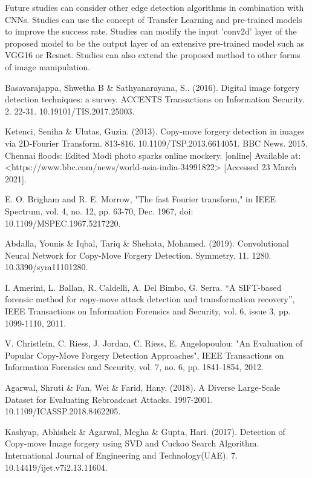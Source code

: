\documentclass[conference]{IEEEtran}
\begin{document}
Future studies can consider other edge detection algorithms in combination with CNNs. Studies can use the concept of Transfer Learning and pre-trained models to improve the success rate. Studies can modify the input 'conv2d' layer of the proposed model to be the output layer of an extensive pre-trained model such as VGG16 or Resnet. Studies can also extend the proposed method to other forms of image manipulation.


\begin{thebibliography}{00}
Basavarajappa, Shwetha B \& Sathyanarayana, S.. (2016). Digital image forgery detection techniques: a survey. ACCENTS Transactions on Information Security. 2. 22-31. 10.19101/TIS.2017.25003.

Ketenci, Seniha \& Ulutas, Guzin. (2013). Copy-move forgery detection in images via 2D-Fourier Transform. 813-816. 10.1109/TSP.2013.6614051. 
BBC News. 2015. Chennai floods: Edited Modi photo sparks online mockery. [online] Available at: <https://www.bbc.com/news/world-asia-india-34991822> [Accessed 23 March 2021].

E. O. Brigham and R. E. Morrow, "The fast Fourier transform," in IEEE Spectrum, vol. 4, no. 12, pp. 63-70, Dec. 1967, doi: 10.1109/MSPEC.1967.5217220.

Abdalla, Younis \& Iqbal, Tariq \& Shehata, Mohamed. (2019). Convolutional Neural Network for Copy-Move Forgery Detection. Symmetry. 11. 1280. 10.3390/sym11101280.

 I. Amerini, L. Ballan, R. Caldelli, A. Del Bimbo, G. Serra. 
“A SIFT-based forensic method for copy-move attack detection and transformation recovery”, IEEE Transactions on Information Forensics and Security, vol. 6, issue 3, pp. 1099-1110, 2011.

V. Christlein, C. Riess, J. Jordan, C. Riess, E. Angelopoulou: 
"An Evaluation of Popular Copy-Move Forgery Detection Approaches", 
IEEE Transactions on Information Forensics and Security, vol. 7, no. 6, pp. 1841-1854, 2012.

Agarwal, Shruti \& Fan, Wei \& Farid, Hany. (2018). A Diverse Large-Scale Dataset for Evaluating Rebroadcast Attacks. 1997-2001. 10.1109/ICASSP.2018.8462205.

Kashyap, Abhishek \& Agarwal, Megha \& Gupta, Hari. (2017). Detection of Copy-move Image forgery using SVD and Cuckoo Search Algorithm. International Journal of Engineering and Technology(UAE). 7. 10.14419/ijet.v7i2.13.11604. 


\end{thebibliography}
\end{document}
